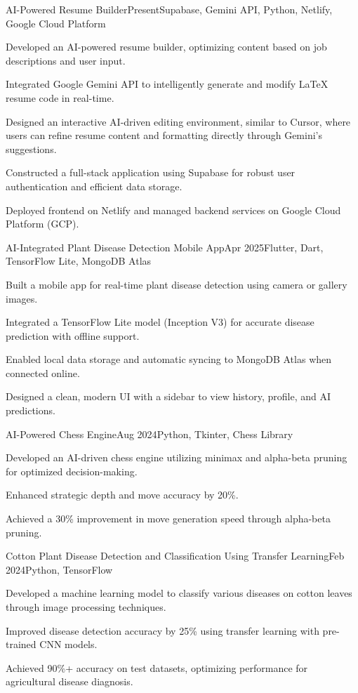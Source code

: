 \documentclass{professional_resume}
\begin{document}
\begin{rSubsection}{AI-Powered Resume Builder}{Present}{Supabase, Gemini API, Python, Netlify, Google Cloud Platform}{}
\item Developed an AI-powered resume builder, optimizing content based on job descriptions and user input.
\item Integrated Google Gemini API to intelligently generate and modify LaTeX resume code in real-time.
\item Designed an interactive AI-driven editing environment, similar to Cursor, where users can refine resume content and formatting directly through Gemini's suggestions.
\item Constructed a full-stack application using Supabase for robust user authentication and efficient data storage.
\item Deployed frontend on Netlify and managed backend services on Google Cloud Platform (GCP).
\end{rSubsection}
\begin{rSubsection}{AI-Integrated Plant Disease Detection Mobile App}{Apr 2025}{Flutter, Dart, TensorFlow Lite, MongoDB Atlas}{}
\item Built a mobile app for real-time plant disease detection using camera or gallery images.
\item Integrated a TensorFlow Lite model (Inception V3) for accurate disease prediction with offline support.
\item Enabled local data storage and automatic syncing to MongoDB Atlas when connected online.
\item Designed a clean, modern UI with a sidebar to view history, profile, and AI predictions.
\end{rSubsection}
\begin{rSubsection}{AI-Powered Chess Engine}{Aug 2024}{Python, Tkinter, Chess Library}{}
\item Developed an AI-driven chess engine utilizing minimax and alpha-beta pruning for optimized decision-making.
\item Enhanced strategic depth and move accuracy by 20\%.
\item Achieved a 30\% improvement in move generation speed through alpha-beta pruning.
\end{rSubsection}
\begin{rSubsection}{Cotton Plant Disease Detection and Classification Using Transfer Learning}{Feb 2024}{Python, TensorFlow}{}
\item Developed a machine learning model to classify various diseases on cotton leaves through image processing techniques.
\item Improved disease detection accuracy by 25\% using transfer learning with pre-trained CNN models.
\item Achieved 90\%+ accuracy on test datasets, optimizing performance for agricultural disease diagnosis.
\end{rSubsection}
\end{document}
